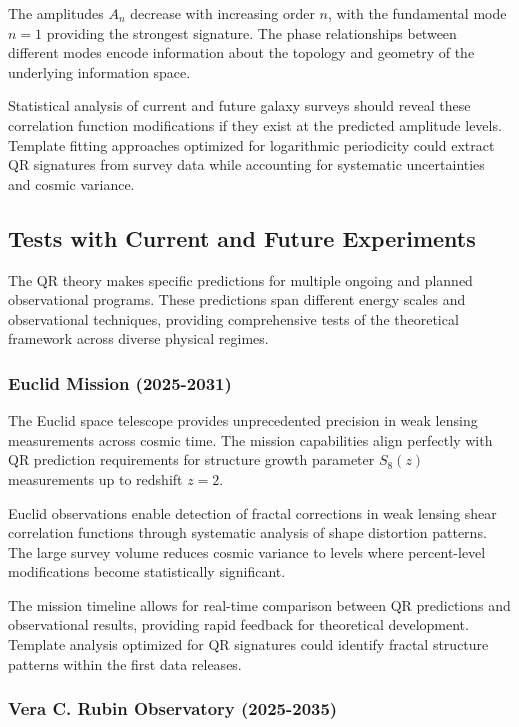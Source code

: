 The amplitudes $A_n$ decrease with increasing order $n$, with the fundamental mode $n=1$ providing the strongest signature. The phase relationships between different modes encode information about the topology and geometry of the underlying information space.

Statistical analysis of current and future galaxy surveys should reveal these correlation function modifications if they exist at the predicted amplitude levels. Template fitting approaches optimized for logarithmic periodicity could extract QR signatures from survey data while accounting for systematic uncertainties and cosmic variance.

\subsection{Tests with Current and Future Experiments}
\label{subsec:future-experiments}

The QR theory makes specific predictions for multiple ongoing and planned observational programs. These predictions span different energy scales and observational techniques, providing comprehensive tests of the theoretical framework across diverse physical regimes.

\subsubsection{Euclid Mission (2025-2031)}
\label{subsubsec:euclid-mission}

The Euclid space telescope provides unprecedented precision in weak lensing measurements across cosmic time. The mission capabilities align perfectly with QR prediction requirements for structure growth parameter $S_8(z)$ measurements up to redshift $z = 2$.

Euclid observations enable detection of fractal corrections in weak lensing shear correlation functions through systematic analysis of shape distortion patterns. The large survey volume reduces cosmic variance to levels where percent-level modifications become statistically significant.

The mission timeline allows for real-time comparison between QR predictions and observational results, providing rapid feedback for theoretical development. Template analysis optimized for QR signatures could identify fractal structure patterns within the first data releases.

\subsubsection{Vera C. Rubin Observatory (2025-2035)}
\label{subsubsec:vera-rubin}

